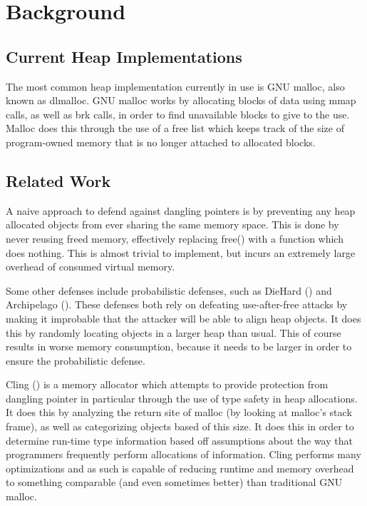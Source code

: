 \documentclass[conference]{IEEEtran}
\begin{document}
\section{Background}

\subsection{Current Heap Implementations}
The most common heap implementation currently in use is GNU malloc, also 
known as dlmalloc. GNU malloc works by allocating blocks of data using mmap 
calls, as well as brk calls, in order to find unavailable blocks to give to 
the use. Malloc does this through the use of a free list which keeps track 
of the size of program-owned memory that is no longer attached to allocated 
blocks.

\subsection{Related Work}
A naive approach to defend against dangling pointers is by preventing any 
heap allocated objects from ever sharing the same memory space. This is done 
by never reusing freed memory, effectively replacing free() with a function 
which does nothing. This is almost trivial to implement, but incurs an 
extremely large overhead of consumed virtual memory.

Some other defenses include probabilistic defenses, such as DieHard 
(\cite{b2}) and Archipelago (\cite{b3}). These defenses both rely on defeating 
use-after-free attacks by making it improbable that the attacker will be able 
to align heap objects. It does this by randomly locating objects in a larger 
heap than usual. This of course results in worse memory consumption, because 
it needs to be larger in order to ensure the probabilistic defense.

Cling (\cite{b1}) is a memory allocator which attempts to provide protection 
from dangling pointer in particular through the use of type safety in heap 
allocations. It does this by analyzing the return site of malloc (by looking 
at malloc’s stack frame), as well as categorizing objects based of this size. 
It does this in order to determine run-time type information based off 
assumptions about the way that programmers frequently perform allocations of 
information. Cling performs many optimizations and as such is capable of 
reducing runtime and memory overhead to something comparable (and even 
sometimes better) than traditional GNU malloc. 
\end{document}

